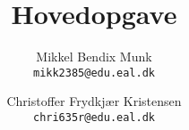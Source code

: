\documentclass[a4paper, 11pt, danish]{report}
\title{Hovedopgave}
\author{
    Mikkel Bendix Munk\\
    \texttt{mikk2385@edu.eal.dk}
    \and
    Christoffer Frydkjær Kristensen\\
    \texttt{chri635r@edu.eal.dk}
}
\begin{document}
\maketitle
\tableofcontents{}

\end{document}
